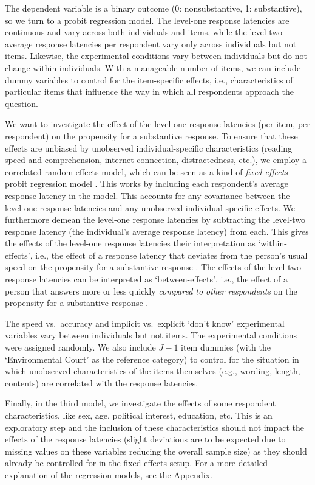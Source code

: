 \documentclass[Royal,times,sageh]{sagej}
\begin{document}
The dependent variable is a binary outcome (0: nonsubstantive, 1:
substantive), so we turn to a probit regression model. The level-one
response latencies are continuous and vary across both individuals and
items, while the level-two average response latencies per respondent
vary only across individuals but not items. Likewise, the experimental
conditions vary between individuals but do not change within
individuals. With a manageable number of items, we can include dummy
variables to control for the item-specific effects, i.e.,
characteristics of particular items that influence the way in which all
respondents approach the question.

We want to investigate the effect of the level-one response latencies
(per item, per respondent) on the propensity for a substantive response.
To ensure that these effects are unbiased by unobserved
individual-specific characteristics (reading speed and comprehension,
internet connection, distractedness, etc.), we employ a correlated
random effects model, which can be seen as a kind of \emph{fixed
effects} probit regression model \citep{Mundlak1978, Wooldridge2002}.
This works by including each respondent's average response latency in
the model. This accounts for any covariance between the level-one
response latencies and any unobserved individual-specific effects. We
furthermore demean the level-one response latencies by subtracting the
level-two response latency (the individual's average response latency)
from each. This gives the effects of the level-one response latencies
their interpretation as `within-effects', i.e., the effect of a response
latency that deviates from the person's usual speed on the propensity
for a substantive response
\citep{Ruettenauer2019, Hamaker2019, Wooldridge2002}. The effects of the
level-two response latencies can be interpreted as `between-effects',
i.e., the effect of a person that answers more or less quickly
\emph{compared to other respondents} on the propensity for a substantive
response \citep{Bell2015, Schunck2017}.

The speed vs.~accuracy and implicit vs.~explicit `don't know'
experimental variables vary between individuals but not items. The
experimental conditions were assigned randomly. We also include
\(J - 1\) item dummies (with the `Environmental Court' as the reference
category) to control for the situation in which unobserved
characteristics of the items themselves (e.g., wording, length,
contents) are correlated with the response latencies.

Finally, in the third model, we investigate the effects of some
respondent characteristics, like sex, age, political interest,
education, etc. This is an exploratory step and the inclusion of these
characteristics should not impact the effects of the response latencies
(slight deviations are to be expected due to missing values on these
variables reducing the overall sample size) as they should already be
controlled for in the fixed effects setup. For a more detailed
explanation of the regression models, see the Appendix.
\end{document}
